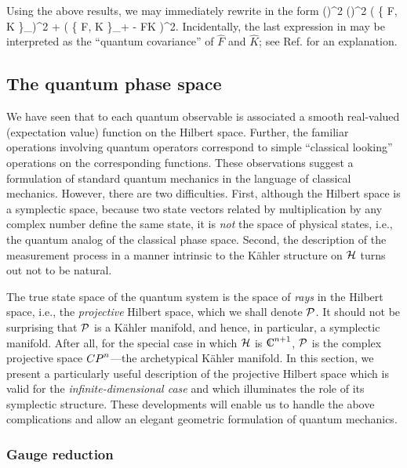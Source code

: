 Using the above results, we may immediately rewrite 
in the form 
%
\be \label{new_unc_reln}
(\D {})^2 (\D {})^2 \ge
\bigg(  \{ F, K \}_\W \bigg)^2
+ \big( \{ F, K \}_+ - FK \big)^2.
\ee
%
Incidentally, the last expression in  may be
interpreted as the ``quantum covariance'' of $\hat{F}$ and $\hat{K}$;
see Ref.  for an explanation.


\subsection{The quantum phase space} \label{sec2.B}

We have seen that to each quantum observable is associated a smooth
real-valued (expectation value) function on the Hilbert space.
Further, the familiar operations involving quantum operators
correspond to simple ``classical looking'' operations on the
corresponding functions.  These observations suggest a formulation of
standard quantum mechanics in the language of classical mechanics.
However, there are two difficulties.  First, although the Hilbert
space is a symplectic space, because two state vectors related by
multiplication by any complex number define the same state, it is {\it
not} the space of physical states, i.e., the quantum analog of the
classical phase space.  Second, the description of the measurement
process in a manner intrinsic to the K\"ahler structure on $\H$ turns
out not to be natural.

The true state space of the quantum system is the space of {\em rays}
in the Hilbert space, i.e., the {\em projective} Hilbert space, which
we shall denote $\P$.  It should not be surprising that $\P$ is a
K\"ahler manifold, and hence, in particular, a symplectic manifold.
After all, for the special case in which $\H$ is $\C^{n+1}$, $\P$ is
the complex projective space ${\Bbb CP}^n$---the archetypical K\"ahler
manifold.  In this section, we present a particularly useful
description of the projective Hilbert space which is valid for the
{\it infinite-dimensional case} and which illuminates the role of its
symplectic structure.  These developments will enable us to handle the
above complications and allow an elegant geometric formulation of
quantum mechanics.


\subsubsection{Gauge reduction}

